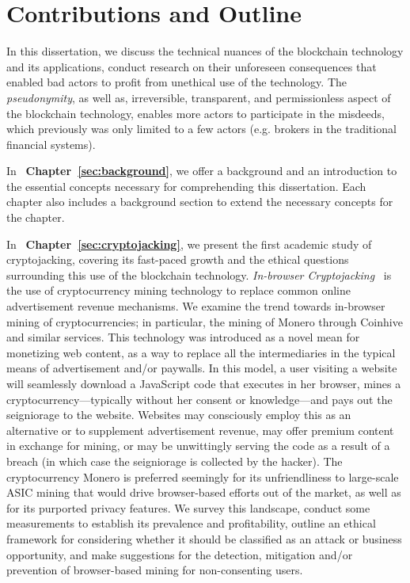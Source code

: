 \section{Contributions and Outline} 

In this dissertation, we discuss the technical nuances of the blockchain technology and its applications, conduct research on their unforeseen consequences that enabled bad actors to profit from unethical use of the technology. The \textit{pseudonymity}, as well as, irreversible, transparent, and permissionless aspect of the blockchain technology, enables more actors to participate in the misdeeds, which previously was only limited to a few actors (e.g. brokers in the traditional financial systems).

In ~\textbf{Chapter~\ref{sec:background}}, we offer a background and an introduction to the essential concepts necessary for comprehending this dissertation. Each chapter also includes a background section to extend the necessary concepts for the chapter.

In ~\textbf{Chapter~\ref{sec:cryptojacking}}, we present the first academic study of cryptojacking, covering its fast-paced growth and the ethical questions surrounding this use of the blockchain technology. \textit{In-browser Cryptojacking}~\cite{eskandari2018first} is the use of cryptocurrency mining technology to replace common online advertisement revenue mechanisms. We examine the trend towards in-browser mining of cryptocurrencies; in particular, the mining of Monero through Coinhive and similar services. This technology was introduced as a novel mean for monetizing web content, as a way to replace all the intermediaries in the typical means of advertisement and/or paywalls. In this model, a user visiting a website will seamlessly download a JavaScript code that executes in her browser, mines a cryptocurrency---typically without her consent or knowledge---and pays out the seigniorage to the website. Websites may consciously employ this as an alternative or to supplement advertisement revenue, may offer premium content in exchange for mining, or may be unwittingly serving the code as a result of a breach (in which case the seigniorage is collected by the hacker). The cryptocurrency Monero is preferred seemingly for its unfriendliness to large-scale ASIC mining that would drive browser-based efforts out of the market, as well as for its purported privacy features. We survey this landscape, conduct some measurements to establish its prevalence and profitability, outline an ethical framework for considering whether it should be classified as an attack or business opportunity, and make suggestions for the detection, mitigation and/or prevention of browser-based mining for non-consenting users.


